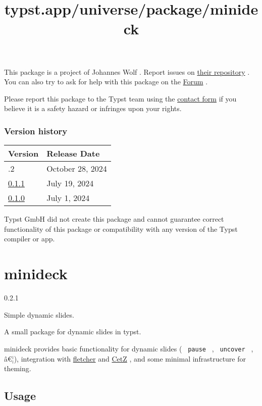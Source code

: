 This package is a project of Johannes Wolf . Report issues on
\href{https://github.com/johannes-wolf/cetz-venn}{their repository} .
You can also try to ask for help with this package on the
\href{https://forum.typst.app}{Forum} .

Please report this package to the Typst team using the
\href{https://typst.app/contact}{contact form} if you believe it is a
safety hazard or infringes upon your rights.

\label{versions}
\subsubsection{Version history}\label{version-history}

\begin{longtable}[]{@{}ll@{}}
\toprule\noalign{}
Version & Release Date \\
\midrule\noalign{}
\endhead
\bottomrule\noalign{}
\endlastfoot
0.1.2 & October 28, 2024 \\
\href{https://typst.app/universe/package/cetz-venn/0.1.1/}{0.1.1} & July
19, 2024 \\
\href{https://typst.app/universe/package/cetz-venn/0.1.0/}{0.1.0} & July
1, 2024 \\
\end{longtable}

Typst GmbH did not create this package and cannot guarantee correct
functionality of this package or compatibility with any version of the
Typst compiler or app.


\title{typst.app/universe/package/minideck}

\label{banner}
\section{minideck}\label{minideck}

{ 0.2.1 }

Simple dynamic slides.

\label{readme}
A small package for dynamic slides in typst.

minideck provides basic functionality for dynamic slides (
\texttt{\ pause\ } , \texttt{\ uncover\ } , â€¦), integration with
\href{https://typst.app/universe/package/fletcher}{fletcher} and
\href{https://typst.app/universe/package/cetz/}{CetZ} , and some minimal
infrastructure for theming.

\subsection{Usage}\label{usage}

